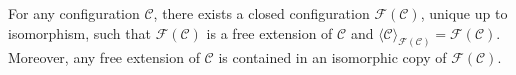 For any configuration $\mathcal{C}$, there exists a closed configuration $\mathcal{F}(\mathcal{C})$, unique up to isomorphism, such that $\mathcal{F}(\mathcal{C})$ is a free extension of $\mathcal{C}$ and $\langle \mathcal{C} \rangle_{\mathcal{F}(\mathcal{C})} = \mathcal{F}(\mathcal{C})$. Moreover, any free extension of $\mathcal{C}$ is contained in an isomorphic copy of $\mathcal{F}(\mathcal{C})$.
